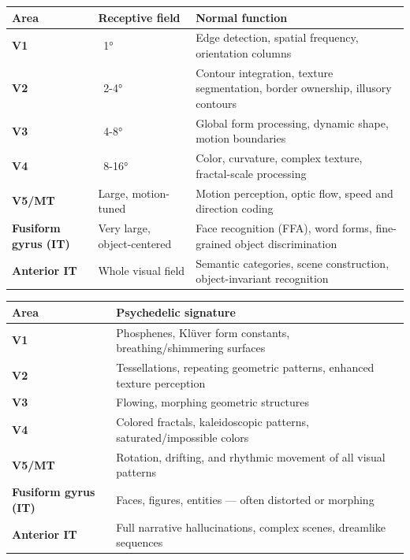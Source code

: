 \documentclass[11pt, twoside, openright]{book}
\begin{document}
{\footnotesize
\noindent
\begin{tabularx}{\linewidth}{>{\hsize=0.7\hsize}X X X}
\toprule
\textbf{Area} & \textbf{Receptive field} & \textbf{Normal function} \\
\midrule
\textbf{V1} & ~1° & Edge detection, spatial frequency, orientation columns \\
[6pt]
\textbf{V2} & ~2-4° & Contour integration, texture segmentation, border ownership, illusory contours \\
[6pt]
\textbf{V3} & ~4-8° & Global form processing, dynamic shape, motion boundaries \\
[6pt]
\textbf{V4} & ~8-16° & Color, curvature, complex texture, fractal-scale processing \\
[6pt]
\textbf{V5/MT} & Large, motion-tuned & Motion perception, optic flow, speed and direction coding \\
[6pt]
\textbf{Fusiform gyrus (IT)} & Very large, object-centered & Face recognition (FFA), word forms, fine-grained object discrimination \\
[6pt]
\textbf{Anterior IT} & Whole visual field & Semantic categories, scene construction, object-invariant recognition \\
[6pt]
\bottomrule
\end{tabularx}
}
\clearpage

{\footnotesize
\noindent
\begin{tabularx}{\linewidth}{>{\hsize=0.7\hsize}X X}
\toprule
\textbf{Area} & \textbf{Psychedelic signature} \\
\midrule
\textbf{V1} & Phosphenes, Klüver form constants, breathing/shimmering surfaces \\
[6pt]
\textbf{V2} & Tessellations, repeating geometric patterns, enhanced texture perception \\
[6pt]
\textbf{V3} & Flowing, morphing geometric structures \\
[6pt]
\textbf{V4} & Colored fractals, kaleidoscopic patterns, saturated/impossible colors \\
[6pt]
\textbf{V5/MT} & Rotation, drifting, and rhythmic movement of all visual patterns \\
[6pt]
\textbf{Fusiform gyrus (IT)} & Faces, figures, entities --- often distorted or morphing \\
[6pt]
\textbf{Anterior IT} & Full narrative hallucinations, complex scenes, dreamlike sequences \\
[6pt]
\bottomrule
\end{tabularx}
}
\end{document}
